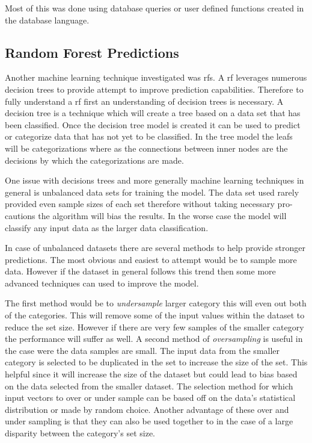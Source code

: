 
Most of this was done using database queries or user defined functions created in the database language.

\subsection{Random Forest Predictions}
\label{sec:random_forest_predictions}

Another machine learning technique investigated was \gls{rf}s. A \gls{rf} leverages numerous decision trees to provide attempt to improve prediction capabilities. Therefore to fully understand a \gls{rf} first an understanding of decision trees is necessary. A decision tree is a technique which will create a tree based on a data set that has been classified. Once the decision tree model is created it can be used to predict or categorize data that has not yet to be classified. In the tree model the leafs will be categorizations where as the connections between inner nodes are the decisions by which the categorizations are made.

One issue with decisions trees and more generally machine learning techniques in general is unbalanced data sets for training the model. The data set used rarely provided even sample sizes of each set therefore without taking necessary pro-cautions the algorithm will bias the results. In the worse case the model will classify any input data as the larger data classification.

In case of unbalanced datasets there are several methods to help provide stronger predictions. The most obvious and easiest to attempt would be to sample more data. However if the dataset in general follows this trend then some more advanced techniques can used to improve the model.

 
The first method would be to \textit{undersample} larger category this will even out both of the categories. This will remove some of the input values within the dataset to reduce the set size. However if there are very few samples of the smaller category the performance will suffer as well. A second method of \textit{oversampling} is useful in the case were the data samples are small. The input data from the smaller category is selected to be duplicated in the set to increase the size of the set. This helpful since it will increase the size of the dataset but could lead to bias based on the data selected from the smaller dataset. The selection method for which input vectors to over or under sample can be based off on the data's statistical distribution or made by random choice. Another advantage of these over and under sampling is that they can also be used together to in the case of a large disparity between the category's set size. 

